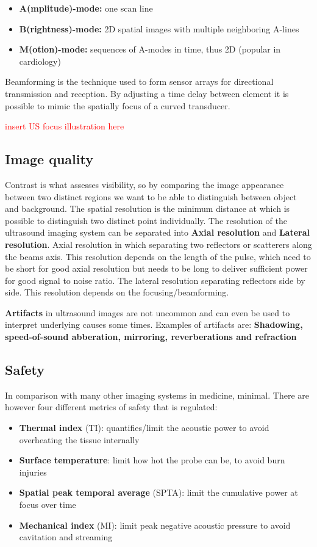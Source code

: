 		\begin{itemize}
			\item \textbf{A(mplitude)-mode:} one scan line
			\item \textbf{B(rightness)-mode:} 2D spatial images with multiple neighboring A-lines
			\item \textbf{M(otion)-mode:} sequences of A-modes in time, thus 2D (popular in cardiology) 
		\end{itemize}

	Beamforming is the technique used to form sensor arrays for directional transmission and reception. By adjusting a time delay between element it is possible to mimic the spatially focus of a curved transducer. 

	\textcolor{red}{insert US focus illustration here} 


	\subsection{Image quality}
	Contrast is what assesses visibility, so by comparing the image appearance between two distinct regions we want to be able to distinguish between object and background. The spatial resolution is the minimum distance at which is possible to distinguish two distinct point individually. The resolution of the ultrasound imaging system can be separated into \textbf{Axial resolution} and \textbf{Lateral resolution}. Axial resolution in which separating two reflectors or scatterers along the beams axis. This resolution depends on the length of the pulse, which need to be short for good axial resolution but needs to be long to deliver sufficient power for good signal to noise ratio. The lateral resolution separating reflectors side by side. This resolution depends on the focusing/beamforming. 

	\textbf{Artifacts} in ultrasound images are not uncommon and can even be used to interpret underlying causes some times. Examples of artifacts are: \textbf{Shadowing, speed-of-sound abberation, mirroring, reverberations and refraction} 

	\subsection{Safety}
	In comparison with many other imaging systems in medicine, minimal. There are however four different metrics of safety that is regulated: 

		\begin{itemize}
			\item \textbf{Thermal index} (TI): quantifies/limit the acoustic power to avoid overheating the tissue internally
			\item \textbf{Surface temperature}: limit how hot the probe can be, to avoid burn injuries 
			\item \textbf{Spatial peak temporal average} (SPTA): limit the cumulative power at focus over time
			\item \textbf{Mechanical index} (MI):  limit peak negative acoustic pressure to avoid cavitation and streaming
		\end{itemize}

